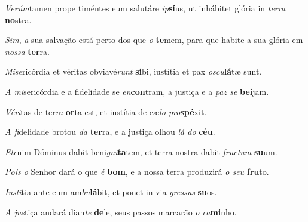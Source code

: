 \begin{greenumerate}
  \setcounter{enumi}{1}


  \item \textit{Verúm}tamen prope timéntes eum salutáre \textit{ip}\textbf{sí}us, {\GreStar} ut inhábitet glória in \textit{terra} \textbf{no}stra. 
  \switchcolumn\setcounter{enumi}{1}


  \item \textit{Sim}, \textit{a} sua salvação está perto dos que \textit{o} \textbf{te}mem, {\GreStar} para que habite a sua glória em \textit{nossa} \textbf{ter}ra. 

  \switchcolumn*


  \item \textit{Mise}ricórdia et véritas obviavé\textit{runt} \textbf{si}bi, {\GreStar} iustítia et pax \textit{oscu}\textbf{lá}tæ sunt. 

  \switchcolumn%

  \item \textit{A mi}sericórdia e a fidelidade se \textit{en}\textbf{con}tram, {\GreStar} a justiça e a \textit{paz se} \textbf{bei}jam. 

  \switchcolumn*


  \item \textit{Véri}tas de ter\textit{ra} \textbf{or}ta est, {\GreStar} et iustítia de cæ\textit{lo pro}\textbf{spé}xit. 

  \switchcolumn%

  \item \textit{A fi}delidade brotou \textit{da} \textbf{ter}ra, {\GreStar} e a justiça olhou \textit{lá do} \textbf{céu}. 

  \switchcolumn*


  \item \textit{Ete}nim Dóminus dabit beni\textit{gni}\textbf{ta}tem, {\GreStar} et terra nostra dabit \textit{fructum} \textbf{su}um. 

  \switchcolumn%

  \item \textit{Pois o} Senhor dará o que \textit{é} \textbf{bom}, {\GreStar} e a nossa terra produzirá \textit{o seu} \textbf{fru}to. 

  \switchcolumn*


  \item \textit{Iustí}tia ante eum am\textit{bu}\textbf{lá}bit, {\GreStar} et ponet in via \textit{gressus} \textbf{su}os. 

  \switchcolumn%

  \item \textit{A jus}tiça andará dian\textit{te} \textbf{de}le, {\GreStar} seus passos marcarão \textit{o ca}\textbf{mi}nho. 
\end{greenumerate}
